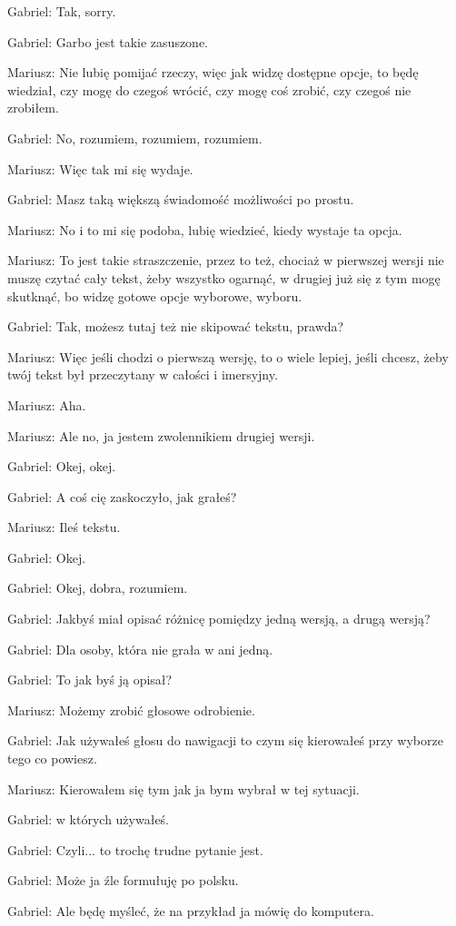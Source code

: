 Gabriel: Tak, sorry.

Gabriel: Garbo jest takie zasuszone.

Mariusz: Nie lubię pomijać rzeczy, więc jak widzę dostępne opcje, to będę wiedział, czy mogę do czegoś wrócić, czy mogę coś zrobić, czy czegoś nie zrobiłem.

Gabriel: No, rozumiem, rozumiem, rozumiem.

Mariusz: Więc tak mi się wydaje.

Gabriel: Masz taką większą świadomość możliwości po prostu.

Mariusz: No i to mi się podoba, lubię wiedzieć, kiedy wystaje ta opcja.

Mariusz: To jest takie straszczenie, przez to też, chociaż w pierwszej wersji nie muszę czytać cały tekst, żeby wszystko ogarnąć, w drugiej już się z tym mogę skutknąć, bo widzę gotowe opcje wyborowe, wyboru.

Gabriel: Tak, możesz tutaj też nie skipować tekstu, prawda?

Mariusz: Więc jeśli chodzi o pierwszą wersję, to o wiele lepiej, jeśli chcesz, żeby twój tekst był przeczytany w całości i imersyjny.

Mariusz: Aha.

Mariusz: Ale no, ja jestem zwolennikiem drugiej wersji.

Gabriel: Okej, okej.

Gabriel: A coś cię zaskoczyło, jak grałeś?

Mariusz: Ileś tekstu.

Gabriel: Okej.

Gabriel: Okej, dobra, rozumiem.

Gabriel: Jakbyś miał opisać różnicę pomiędzy jedną wersją, a drugą wersją?

Gabriel: Dla osoby, która nie grała w ani jedną.

Gabriel: To jak byś ją opisał?

Mariusz: Możemy zrobić głosowe odrobienie.

Gabriel: Jak używałeś głosu do nawigacji to czym się kierowałeś przy wyborze tego co powiesz.

Mariusz: Kierowałem się tym jak ja bym wybrał w tej sytuacji.

Gabriel: w których używałeś.

Gabriel: Czyli... to trochę trudne pytanie jest.

Gabriel: Może ja źle formułuję po polsku.

Gabriel: Ale będę myśleć, że na przykład ja mówię do komputera.

